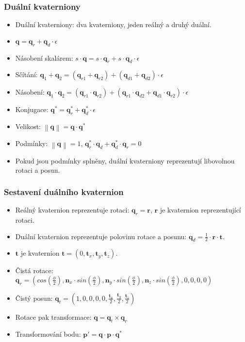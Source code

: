 \begin{frame}
\frametitle{Duální kvaterniony}
	\begin{itemize}
  \item Duální kvaterniony: dva kvaterniony, jeden reálný a druhý duální.
  \item $\mathbf{q} = \mathbf{q}_r + \mathbf{q}_d \cdot \epsilon$
  \item Násobení skalárem: $s \cdot \mathbf{q} = s \cdot \mathbf{q}_r + s \cdot \mathbf{q}_d \cdot \epsilon$
  \item Sčítání: $\mathbf{q}_1 + \mathbf{q}_2  = (\mathbf{q}_{r1}+\mathbf{q}_{r2}) + (\mathbf{q}_{d1} + \mathbf{q}_{d2}) \cdot \epsilon$
  \item Násobení: $\mathbf{q}_1 \cdot \mathbf{q}_2  = (\mathbf{q}_{r1} \cdot \mathbf{q}_{r2}) + (\mathbf{q}_{r1} \cdot \mathbf{q}_{d2} + \mathbf{q}_{d1} \cdot \mathbf{q}_{r2} ) \cdot \epsilon$
  \item Konjugace: $\mathbf{q^*} = \mathbf{q}_{r}^* + \mathbf{q}_{d}^* \cdot \epsilon$
  \item Velikost: $\left\lVert \mathbf{q} \right\rVert = \mathbf{q} \cdot \mathbf{q}^*$
  \item Podmínky: $\left\lVert \mathbf{q} \right\rVert = 1$, $\mathbf{q}_r^* \cdot \mathbf{q}_d + \mathbf{q}_d^* \cdot \mathbf{q}_r = 0$
  \item Pokud jsou podmínky splněny, duální kvaterniony reprezentují libovolnou rotaci a posun.
	\end{itemize}
\end{frame}

\begin{frame}
\frametitle{Sestavení duálního kvaternion}
	\begin{itemize}
  \item Reálný kvaternion reprezentuje rotaci: $\mathbf{q}_r = \mathbf{r}$, $\mathbf{r}$ je kvaternion reprezentující rotaci.
  \item Duální kvaternion reprezentuje polovinu rotace a posunu: $\mathbf{q}_d = \frac{1}{2} \cdot \mathbf{r} \cdot \mathbf{t}$.
  \item $\mathbf{t}$ je kvaternion $\mathbf{t} = (0,\mathbf{t}_x,\mathbf{t}_y,\mathbf{t}_z)$.
  \item Čistá rotace: $\mathbf{q}_r = \left(cos\left(\frac{\phi}{2}\right),\mathbf{n}_x \cdot sin\left(\frac{\phi}{2}\right),\mathbf{n}_y \cdot sin\left(\frac{\phi}{2}\right),\mathbf{n}_z \cdot sin\left(\frac{\phi}{2}\right),0,0,0,0\right)$
  \item Čistý posun: $\mathbf{q}_t = \left(1,0,0,0,0,\frac{\mathbf{t}_x}{2},\frac{\mathbf{t}_y}{2},\frac{\mathbf{t}_z}{2}\right)$
  \item Rotace pak transformace: $\mathbf{q} = \mathbf{q}_t \times \mathbf{q}_r$
  \item Transformování bodu: $\mathbf{p}' = \mathbf{q} \cdot \mathbf{p} \cdot \mathbf{q}^*$
	\end{itemize}
\end{frame}

